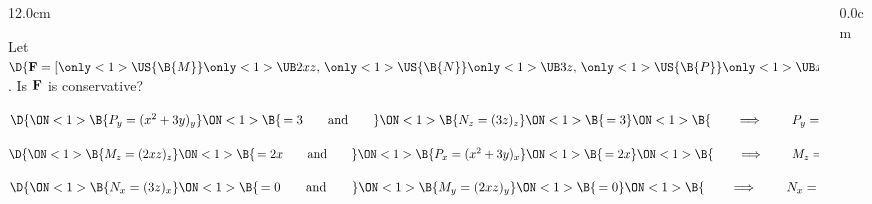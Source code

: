 \begin{frame}
\begin{columns}\begin{column}{12.0cm}

\vspace{0.1cm}

\scriptsize

\EX Let $\D{{\bf F} = [
\only<1>{\US{\B{ M }}}{\only<1>{\UB}{ 2xz }},\,
\only<1>{\US{\B{ N }}}{\only<1>{\UB}{ 3z }},\,
\only<1>{\US{\B{ P }}}{\only<1>{\UB}{ x^2+3y }}]}$. \quad Is ${\bf F}$ is conservative?

\vspace{0.2cm}


\vspace{0.5cm}

$\D{
\ON<1>{\B{P_y = (x^2+3y)_y }}
\ON<1>{\B{\,= 3
\qquad \text{and} \qquad }}
\ON<1>{\B{N_z = (3z)_z}}
\ON<1>{\B{\, = 3}}
\ON<1>{\B{\qquad \implies \qquad P_y=N_z \,\, \checkmark}}
}$

\vspace{0.5cm}

$\D{
\ON<1>{\B{M_z = (2xz)_z }}
\ON<1>{\B{\,= 2x
\qquad \text{and} \qquad }}
\ON<1>{\B{P_x = (x^2+3y)_x }}
\ON<1>{\B{\,= 2x }}
\ON<1>{\B{\qquad \implies \qquad M_z=P_x \,\, \checkmark}}
}$

\vspace{0.5cm}

$\D{
\ON<1>{\B{N_x = (3z)_x }}
\ON<1>{\B{\,= 0
\qquad \text{and} \qquad }}
\ON<1>{\B{M_y = (2xz)_y }}
\ON<1>{\B{\,= 0 }}
\ON<1>{\B{\qquad \implies \qquad N_x=M_y \,\, \checkmark}}
}$

\vspace{0.5cm}


\vspace{4.6cm}

\end{column}\begin{column}{0.0cm}\end{column}\end{columns}
\end{frame}

